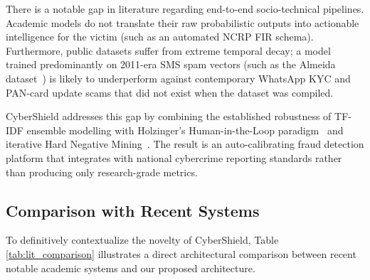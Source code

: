 There is a notable gap in literature regarding end-to-end socio-technical pipelines. Academic models do not translate their raw probabilistic outputs into actionable intelligence for the victim (such as an automated NCRP FIR schema). Furthermore, public datasets suffer from extreme temporal decay; a model trained predominantly on 2011-era SMS spam vectors (such as the Almeida dataset~\cite{almeida2011contributions}) is likely to underperform against contemporary WhatsApp KYC and PAN-card update scams that did not exist when the dataset was compiled. 

CyberShield addresses this gap by combining the established robustness of TF-IDF ensemble modelling with Holzinger's Human-in-the-Loop paradigm~\cite{holzinger2016interactive} and iterative Hard Negative Mining~\cite{shrivastava2016training}. The result is an auto-calibrating fraud detection platform that integrates with national cybercrime reporting standards rather than producing only research-grade metrics.

\subsection{Comparison with Recent Systems}
To definitively contextualize the novelty of CyberShield, Table \ref{tab:lit_comparison} illustrates a direct architectural comparison between recent notable academic systems and our proposed architecture.

\begin{table}[H]
    \centering
    \caption{Architectural Comparison of CyberShield against contemporary spam detection systems.}
    \label{tab:lit_comparison}
\end{table}
